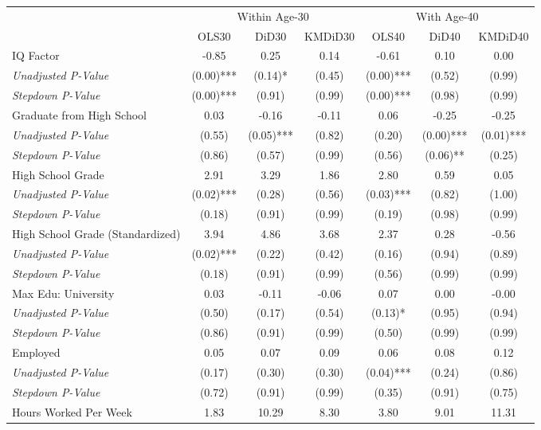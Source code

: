 \begin{tabular}{l c c c c c c}
\toprule
& \multicolumn{3}{c}{Within Age-30} & \multicolumn{3}{c}{With Age-40} \\\cmidrule(lr){2-4} \cmidrule(lr){5-7}
 & OLS30 & DiD30 & KMDiD30 & OLS40 & DiD40 & KMDiD40 \\
\midrule
IQ Factor & -0.85 & 0.25 & 0.14 & -0.61 & 0.10 & 0.00 \\
\quad \textit{Unadjusted P-Value} & (0.00)*** & (0.14)* & (0.45) & (0.00)*** & (0.52) & (0.99) \\
\quad \textit{Stepdown P-Value} & (0.00)*** & (0.91) & (0.99) & (0.00)*** & (0.98) & (0.99) \\
Graduate from High School & 0.03 & -0.16 & -0.11 & 0.06 & -0.25 & -0.25 \\
\quad \textit{Unadjusted P-Value} & (0.55) & (0.05)*** & (0.82) & (0.20) & (0.00)*** & (0.01)*** \\
\quad \textit{Stepdown P-Value} & (0.86) & (0.57) & (0.99) & (0.56) & (0.06)** & (0.25) \\
High School Grade & 2.91 & 3.29 & 1.86 & 2.80 & 0.59 & 0.05 \\
\quad \textit{Unadjusted P-Value} & (0.02)*** & (0.28) & (0.56) & (0.03)*** & (0.82) & (1.00) \\
\quad \textit{Stepdown P-Value} & (0.18) & (0.91) & (0.99) & (0.19) & (0.98) & (0.99) \\
High School Grade (Standardized) & 3.94 & 4.86 & 3.68 & 2.37 & 0.28 & -0.56 \\
\quad \textit{Unadjusted P-Value} & (0.02)*** & (0.22) & (0.42) & (0.16) & (0.94) & (0.89) \\
\quad \textit{Stepdown P-Value} & (0.18) & (0.91) & (0.99) & (0.56) & (0.99) & (0.99) \\
Max Edu: University & 0.03 & -0.11 & -0.06 & 0.07 & 0.00 & -0.00 \\
\quad \textit{Unadjusted P-Value} & (0.50) & (0.17) & (0.54) & (0.13)* & (0.95) & (0.94) \\
\quad \textit{Stepdown P-Value} & (0.86) & (0.91) & (0.99) & (0.50) & (0.99) & (0.99) \\
Employed & 0.05 & 0.07 & 0.09 & 0.06 & 0.08 & 0.12 \\
\quad \textit{Unadjusted P-Value} & (0.17) & (0.30) & (0.30) & (0.04)*** & (0.24) & (0.86) \\
\quad \textit{Stepdown P-Value} & (0.72) & (0.91) & (0.99) & (0.35) & (0.91) & (0.75) \\
Hours Worked Per Week & 1.83 & 10.29 & 8.30 & 3.80 & 9.01 & 11.31 \\

\end{tabular}
